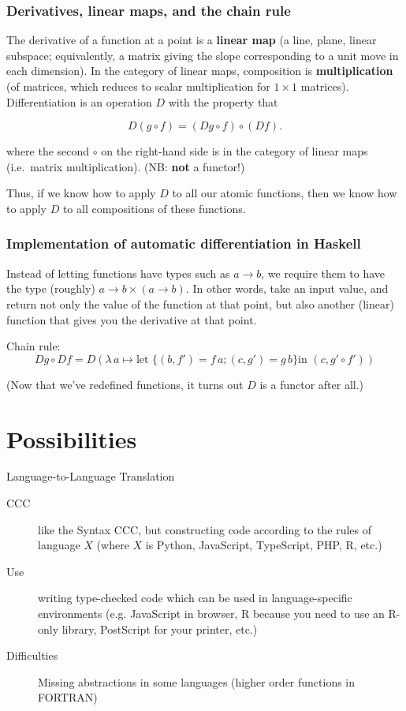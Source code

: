 \documentclass[10pt]{beamer}
\newcommand{\lamf}[2]{\ensuremath{\lambda\, #1 \mapsto #2}}
\theoremstyle{definition}
\theoremstyle{remark}
\numberwithin{equation}{section}
\begin{document}
\begin{frame}[fragile]
  \frametitle{Derivatives, linear maps, and the chain rule}
  
  The derivative of a function at a point is a \textbf{linear map} (a line,
  plane, linear subspace; equivalently, a matrix giving the slope corresponding
  to a unit move in each dimension). In the category of linear maps,
  composition is \textbf{multiplication} (of matrices, which reduces to scalar
  multiplication for $1 \times 1$ matrices). Differentiation is an operation $D$ with the property that

  \[
    D(g \circ f) = (D g \circ f) \circ (D f).
  \]

  where the second $\circ$ on the right-hand side is in the category of linear maps
  (i.e.\ matrix multiplication). {\small (NB: \textbf{not} a functor!)}

  Thus, if we know how to apply $D$ to all our atomic functions, then we know
  how to apply $D$ to all compositions of these functions.
  
\end{frame}

\begin{frame}[fragile]
  \frametitle{Implementation of automatic differentiation in Haskell}

  Instead of letting functions have types such as $a \rightarrow b$, we require them to
  have the type (roughly) $a \rightarrow b \times (a \rightarrow b)$. In other words, take an input
  value, and return not only the value of the function at that point, but also
  another (linear) function that gives you the derivative at that point.

  Chain rule:
  \[
    Dg \circ Df = D (\lamf{a}{\text{let } \{(b, f') = f\,a; (c,g') = g\,b\} \text{
        in }
    (c, g' \circ f')})
\]

(Now that we've redefined functions, it turns out $D$ is a functor after all.)
\end{frame}

\section{Possibilities} %

\begin{frame}[fragile]{Language-to-Language Translation}
  \begin{description}
  \item[CCC] like the Syntax CCC, but constructing code according to the rules of language $X$ (where $X$ is Python, JavaScript, TypeScript, PHP, R, etc.)
  \item[Use] writing type-checked code which can be used in language-specific environments (e.g. JavaScript in browser, R because you need to use an R-only library, PostScript for your printer, etc.)
  \item[Difficulties] Missing abstractions in some languages (higher order functions in FORTRAN)
  \end{description}
\end{frame}
\end{document}
